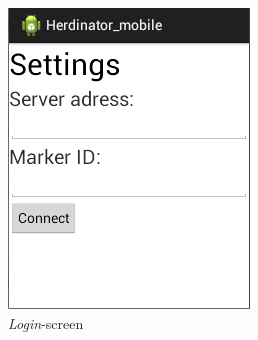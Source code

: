 \documentclass[a4paper,10pt]{report}
\begin{document}
	\begin{figure}[ht]
		\begin{minipage}[b]{0.30\linewidth}
			\centering
			\includegraphics[width=\textwidth]{images/android-application-screen1.png}
			\caption{\emph{Login}-screen}
			\label{fig:android-application-screen1}
		\end{minipage}
		\hspace{0.1cm}
		\begin{minipage}[b]{0.30\linewidth}
			\centering

\end{minipage}
\end{figure}
\end{document}
